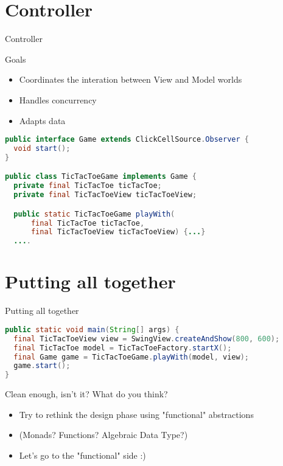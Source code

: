 \documentclass[presentation]{beamer}
\begin{document}
\section{Controller}
\begin{frame}[fragile]{Controller}
\begin{block}{Goals}
  \begin{itemize}
    \item Coordinates the interation between View and Model worlds
    \item Handles concurrency
    \item Adapts data 
  \end{itemize}
\end{block}
\begin{lstlisting}[language=Java]
public interface Game extends ClickCellSource.Observer {
  void start();
}

public class TicTacToeGame implements Game {
  private final TicTacToe ticTacToe;
  private final TicTacToeView ticTacToeView;

  public static TicTacToeGame playWith(
      final TicTacToe ticTacToe, 
      final TicTacToeView ticTacToeView) {...}
  ....

\end{lstlisting}
\end{frame}
\section{Putting all together}
\begin{frame}[fragile]{Putting all together}
\begin{lstlisting}[language=Java]
public static void main(String[] args) {
  final TicTacToeView view = SwingView.createAndShow(800, 600);
  final TicTacToe model = TicTacToeFactory.startX();
  final Game game = TicTacToeGame.playWith(model, view);
  game.start();
}
\end{lstlisting}
\begin{block}{Clean enough, isn't it?}
  What do you think?
  \begin{itemize}
    \item Try to rethink the design phase using "functional" abstractions
    \item (Monads? Functions? Algebraic Data Type?)
    \item Let's go to the "functional" side :)
  \end{itemize}
\end{block}
\end{frame}
\end{document}
